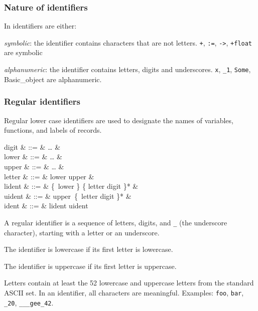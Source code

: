 \subsubsection{Nature of identifiers}

In {\focal} identifiers are either:

\begin{citemize}
\item {\em symbolic}: the identifier contains characters that are not
  letters. {\tt +}, {\tt :=}, {\tt ->}, {\tt +float} are symbolic

\item {\em alphanumeric}: the identifier contains letters, digits and
  underscores. {\tt x}, {\tt \_1}, {\tt Some}, {Basic\_object} are alphanumeric.
\end{citemize}

\subsubsection{Regular identifiers}

Regular lower case identifiers are used to designate the names of variables, functions,
and labels of records.

\begin{syntax}
digit & ::= &  \ldots {} & \\
lower & ::= &  \ldots {} & \\
upper & ::= &  \ldots {} & \\
letter & ::= & lower \mid upper & \\
lident & ::= & \{\ lower \mid \terminal{\_} \}
            \{ letter \mid digit \mid \terminal{\_} \}* & \\
uident & ::= & upper\ \{\ letter \mid digit \mid \terminal{\_} \}* & \\
ident & ::= & lident \mid uident
\end{syntax}
\vspace{0.2cm}

A regular identifier is a sequence of letters, digits, and {\tt \_} (the
underscore character), starting with a letter or an underscore.

The identifier is lowercase if its first letter is lowercase.

The identifier is uppercase if its first letter is uppercase.

Letters contain at least the 52 lowercase and uppercase
letters from the standard ASCII set. In an identifier, all characters
are meaningful.
Examples: {\tt foo}, {\tt bar}, {\tt \_20}, {\tt \_\_\_gee\_42}.


